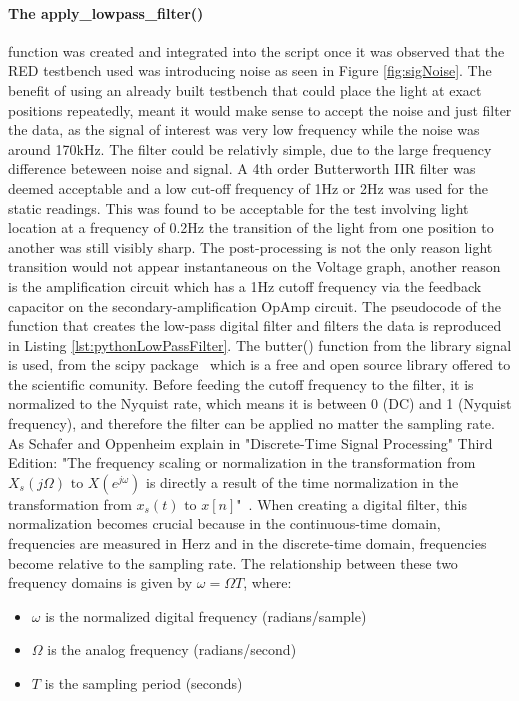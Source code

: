 \paragraph{The apply\_lowpass\_filter()} function was created and integrated into the script once it was observed that the RED testbench used was introducing noise as seen in Figure \ref{fig:sigNoise}. The benefit of using an already built testbench that could place the light at exact positions repeatedly, meant it would make sense to accept the noise and just filter the data, as the signal of interest was very low frequency while the noise was around 170kHz. The filter could be relativly simple, due to the large frequency difference beteween noise and signal. A 4th order Butterworth IIR filter was deemed acceptable and a low cut-off frequency of 1Hz or 2Hz was used for the static readings. This was found to be acceptable for the test involving light location at a frequency of 0.2Hz the transition of the light from one position to another was still visibly sharp. The post-processing is not the only reason light transition would not appear instantaneous on the Voltage graph, another reason is the amplification circuit which has a 1Hz cutoff frequency via the feedback capacitor on the secondary-amplification OpAmp circuit. \label{LowPassFilter}
The pseudocode of the function that creates the low-pass digital filter and filters the data is reproduced in Listing \ref{lst:pythonLowPassFilter}. The butter() function from the library signal is used, from the scipy package~\cite{RefWorks:butter} which is a free and open source library offered to the scientific comunity. Before feeding the cutoff frequency to the filter, it is normalized to the Nyquist rate, which means it is between 0 (DC) and 1 (Nyquist frequency), and therefore the filter can be applied no matter the sampling rate. As Schafer and Oppenheim explain in "Discrete-Time Signal Processing" Third Edition:
"The frequency scaling or normalization in the transformation from $ X_s(j\Omega) \text{ to } X(e^{j\omega})$ is directly a result of the time normalization in the transformation from $x_s(t) \text{ to } x[n]$"~\cite[p.171]{RefWorks:oppenheim2013discrete-time}.
When creating a digital filter, this normalization becomes crucial because in the continuous-time domain, frequencies are measured in Herz and in the discrete-time domain, frequencies become relative to the sampling rate.
The relationship between these two frequency domains is given by $\omega = \Omega T$, where:

\begin{itemize}
    \item $\omega$ is the normalized digital frequency (radians/sample)
    \item $\Omega$ is the analog frequency (radians/second)
    \item $T$ is the sampling period (seconds)
\end{itemize}


